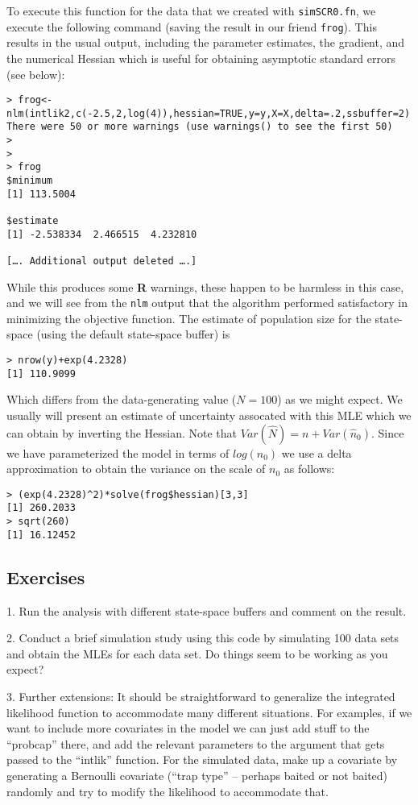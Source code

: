 To execute this function for the data that we created with \mbox{\tt simSCR0.fn},
 we execute the following command (saving the result in our
friend \mbox{\tt frog}).
This results in the usual output, including the parameter estimates,
the gradient, and the numerical Hessian which is useful for obtaining
asymptotic standard errors (see below):
\begin{verbatim}
> frog<-nlm(intlik2,c(-2.5,2,log(4)),hessian=TRUE,y=y,X=X,delta=.2,ssbuffer=2)
There were 50 or more warnings (use warnings() to see the first 50)
> 
>
> frog
$minimum
[1] 113.5004

$estimate
[1] -2.538334  2.466515  4.232810

[…. Additional output deleted ….]
\end{verbatim}
While this produces some {\bf R} warnings, these happen to be harmless
in this case, and we will see from the \mbox{\tt nlm} output that the
algorithm performed satisfactory in minimizing the objective function.
The estimate of population size for the state-space (using the default 
state-space buffer) is
\begin{verbatim}
> nrow(y)+exp(4.2328)
[1] 110.9099
\end{verbatim}
Which differs from the data-generating value ($N=100$) as we might
expect. We usually will present an estimate of uncertainty assocated
with this MLE which we can obtain by inverting the Hessian. Note that
$Var(\hat{N}) = n + Var(\hat{n}_{0})$.
Since we
have parameterized the model in terms of $log(n_{0})$ we use a delta
approximation to obtain the variance on the scale of $n_{0}$ as
follows:
\begin{verbatim}
> (exp(4.2328)^2)*solve(frog$hessian)[3,3]
[1] 260.2033
> sqrt(260)
[1] 16.12452
\end{verbatim}

\subsection{Exercises}


1.	Run the analysis with different state-space buffers and comment on the result. 


2.	Conduct a brief simulation study using this code by simulating 100 data sets and obtain the MLEs for each data set. Do things seem to be working as you expect?


3.	Further extensions: It should be straightforward to generalize the integrated likelihood function to accommodate many different situations. For examples,  if we want to include more covariates in the model we can just add stuff to the “probcap” there, and add the relevant parameters to the argument that gets passed to the “intlik” function.  For the simulated data, make up a covariate by generating a Bernoulli covariate (“trap type” – perhaps baited or not baited) randomly and try to modify the likelihood to accommodate that. 



